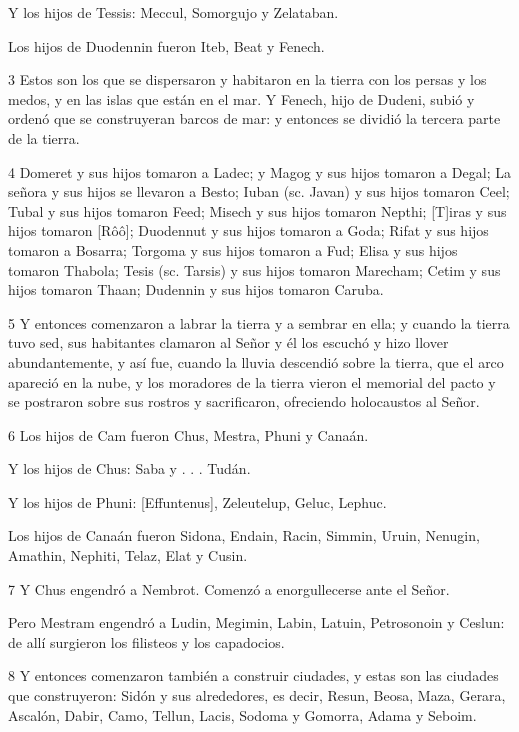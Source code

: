 \par Y los hijos de Tessis: Meccul, Somorgujo y Zelataban.

Los hijos de Duodennin fueron Iteb, Beat y Fenech.

\par 3 Estos son los que se dispersaron y habitaron en la tierra con los persas y los medos, y en las islas que están en el mar. Y Fenech, hijo de Dudeni, subió y ordenó que se construyeran barcos de mar: y entonces se dividió la tercera parte de la tierra.

\par 4 Domeret y sus hijos tomaron a Ladec; y Magog y sus hijos tomaron a Degal; La señora y sus hijos se llevaron a Besto; Iuban (sc. Javan) y sus hijos tomaron Ceel; Tubal y sus hijos tomaron Feed; Misech y sus hijos tomaron Nepthi; [T]iras y sus hijos tomaron [Rôô]; Duodennut y sus hijos tomaron a Goda; Rifat y sus hijos tomaron a Bosarra; Torgoma y sus hijos tomaron a Fud; Elisa y sus hijos tomaron Thabola; Tesis (sc. Tarsis) y sus hijos tomaron Marecham; Cetim y sus hijos tomaron Thaan; Dudennin y sus hijos tomaron Caruba.

\par 5 Y entonces comenzaron a labrar la tierra y a sembrar en ella; y cuando la tierra tuvo sed, sus habitantes clamaron al Señor y él los escuchó y hizo llover abundantemente, y así fue, cuando la lluvia descendió sobre la tierra, que el arco apareció en la nube, y los moradores de la tierra vieron el memorial del pacto y se postraron sobre sus rostros y sacrificaron, ofreciendo holocaustos al Señor.

\par 6 Los hijos de Cam fueron Chus, Mestra, Phuni y Canaán.

\par Y los hijos de Chus: Saba y . . . Tudán.

\par Y los hijos de Phuni: [Effuntenus], Zeleutelup, Geluc, Lephuc.

Los hijos de Canaán fueron Sidona, Endain, Racin, Simmin, Uruin, Nenugin, Amathin, Nephiti, Telaz, Elat y Cusin.

\par 7 Y Chus engendró a Nembrot. Comenzó a enorgullecerse ante el Señor.

Pero Mestram engendró a Ludin, Megimin, Labin, Latuin, Petrosonoin y Ceslun: de allí surgieron los filisteos y los capadocios.

\par 8 Y entonces comenzaron también a construir ciudades, y estas son las ciudades que construyeron: Sidón y sus alrededores, es decir, Resun, Beosa, Maza, Gerara, Ascalón, Dabir, Camo, Tellun, Lacis, Sodoma y Gomorra, Adama y Seboim.

